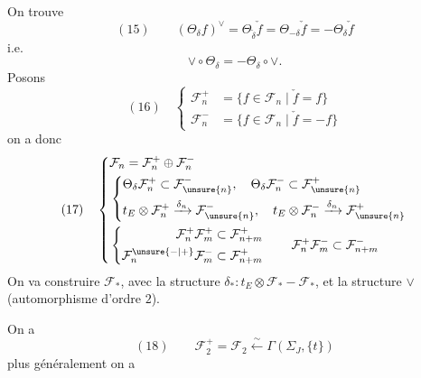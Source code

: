 On trouve
\[
(15)\qquad(\Theta_\delta f)^\vee
=\Theta_{\check\delta}\check f=\Theta_{-\delta}\check f=-\Theta_\delta\check f
\]
i.e.
\[
\vee\circ\Theta_\delta=-\Theta_\delta\circ\vee.
\]
Posons
\[
(16)\quad\left\{\begin{aligned}
\mathcal F_n^+&=\{f\in\mathcal F_n\mid\check f=f\}\\
\mathcal F_n^-&=\{f\in\mathcal F_n\mid\check f=-f\}
\end{aligned}\right.
\]
on a donc
\[
(17)\quad\left\{\begin{aligned}
&\mathcal F_n=\mathcal F_n^+\oplus\mathcal F_n^-\\
&\left\{\begin{aligned}
&\Theta_\delta\mathcal F_n^+\subset\mathcal F_{\unsure{n}}^-,\quad
\Theta_\delta\mathcal F_n^-\subset\mathcal F_{\unsure{n}}^+\\
&t_E\otimes\mathcal F_n^+\xrightarrow{\delta_n}\mathcal F_{\unsure{n}}^-,\quad
t_E\otimes\mathcal F_n^-\xrightarrow{\delta_n}\mathcal F_{\unsure{n}}^+
\end{aligned}\right.\\
&\left\{\begin{aligned}
\mathcal F_n^+\mathcal F_m^+&\subset\mathcal F_{n+m}^+\\
\mathcal F_n^{\unsure{-|+}}\mathcal F_m^-&\subset\mathcal F_{n+m}^+
\end{aligned}\right.\qquad
\mathcal F_n^+\mathcal F_m^-\subset\mathcal F_{n+m}^-
\end{aligned}\right.
\]
\margin{\deleted{\unsure{$\{$}}}
On va construire  $\mathcal F_*$, avec la structure
$\delta_*:t_E\otimes\mathcal F_*\mathbin{-}\mathcal F_*$,
et la structure $\vee$
(automorphisme d'ordre $2$).

On a
\[
(18)\qquad\mathcal F_2^+=\mathcal F_2\xleftarrow{\sim}\Gamma(\Sigma_J,\{t\})
\]
plus généralement on a

